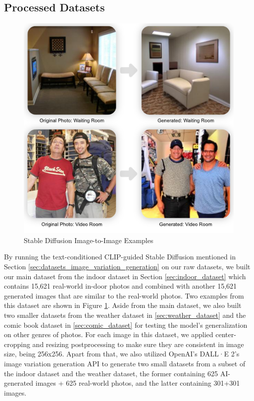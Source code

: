 \documentclass[11pt]{article}
\begin{document}
\subsection{Processed Datasets}

\begin{figure}[ht]
  \centering
  \includegraphics[width=\linewidth]{./assets/paper_dataset_processed.jpg}
  \caption{Stable Diffusion Image-to-Image Examples}
  \label{fig:paper_processed_dataset}
\end{figure}

By running the text-conditioned CLIP-guided Stable Diffusion mentioned in Section \ref{sec:datasets_image_variation_generation} on our raw datasets, we built our main dataset from the indoor dataset in Section \ref{sec:indoor_dataset} which contains 15,621 real-world in-door photos and combined with another 15,621 generated images that are similar to the real-world photos. Two examples from this dataset are shown in Figure \ref{fig:paper_processed_dataset}. Aside from the main dataset, we also built two smaller datasets from the weather dataset in \ref{sec:weather_dataset} and the comic book dataset in \ref{sec:comic_dataset} for testing the model's generalization on other genres of photos. For each image in this dataset, we applied center-cropping and resizing postprocessing to make sure they are consistent in image size, being 256x256. Apart from that, we also utilized OpenAI's DALL·E 2's image variation generation API to generate two small datasets from a subset of the indoor dataset and the weather dataset, the former containing 625 AI-generated images + 625 real-world photos, and the latter containing 301+301 images.
\end{document}
